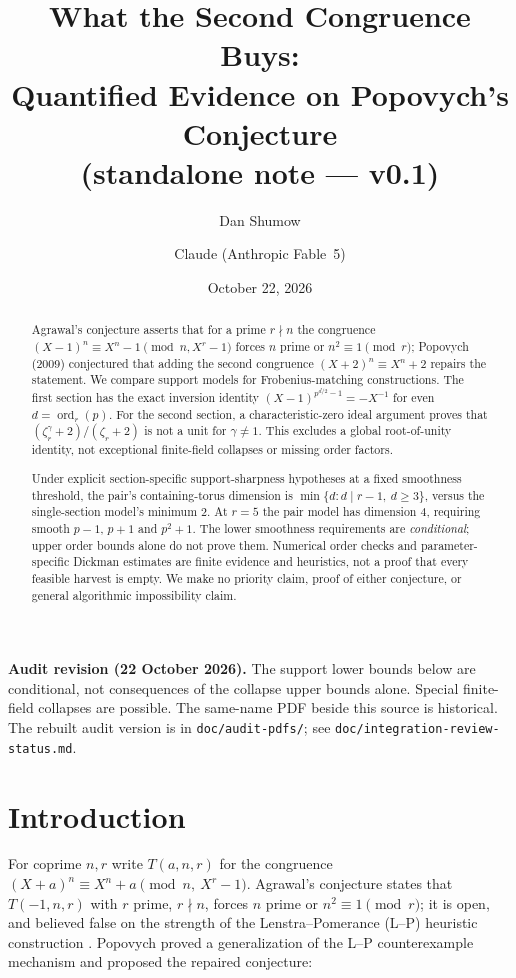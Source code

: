 \documentclass[11pt]{article}
\title{What the Second Congruence Buys:\\ Quantified Evidence on
Popovych's Conjecture\\ \large (standalone note --- v0.1)}
\author{Dan Shumow \and Claude (Anthropic Fable~5)}
\date{October 22, 2026}
\theoremstyle{remark}
\DeclareMathOperator{\ord}{ord}
\begin{document}
\maketitle

\noindent\textbf{Audit revision (22 October 2026).}
The support lower bounds below are conditional, not consequences of the
collapse upper bounds alone. Special finite-field collapses are possible.
The same-name PDF beside this source is historical. The rebuilt audit version
is in \texttt{doc/audit-pdfs/}; see \texttt{doc/integration-review-status.md}.

\begin{abstract}
Agrawal's conjecture asserts that for a prime $r \nmid n$ the congruence
$(X-1)^n \equiv X^n - 1 \pmod{n, X^r - 1}$ forces $n$ prime or
$n^2 \equiv 1 \pmod r$; Popovych (2009) conjectured that adding the second
congruence $(X+2)^n\equiv X^n+2$ repairs the statement.
We compare support models for Frobenius-matching constructions. The first
section has the exact inversion identity
$(X-1)^{p^{d/2}-1}=-X^{-1}$ for even $d=\ord_r(p)$.
For the second section, a characteristic-zero ideal argument proves that
$(\zeta_r^\gamma+2)/(\zeta_r+2)$ is not a unit for $\gamma\ne1$.
This excludes a global root-of-unity identity, not exceptional finite-field
collapses or missing order factors.

Under explicit section-specific support-sharpness hypotheses at a fixed
smoothness threshold, the pair's containing-torus dimension is
$\min\{d:d\mid r-1,\ d\ge3\}$, versus the single-section model's minimum
$2$. At $r=5$ the pair model has dimension $4$, requiring smooth
$p-1$, $p+1$ and $p^2+1$. The lower smoothness requirements are
\emph{conditional}; upper order bounds alone do not prove them.
Numerical order checks and parameter-specific Dickman estimates are finite
evidence and heuristics, not a proof that every feasible harvest is empty.
We make no priority claim, proof of either conjecture, or general
algorithmic impossibility claim.
\end{abstract}

\section{Introduction}

For coprime $n, r$ write $T(a, n, r)$ for the congruence
$(X + a)^n \equiv X^n + a \pmod{n,\ X^r - 1}$. Agrawal's conjecture
\cite{AKS,BP01} states that $T(-1, n, r)$ with $r$ prime, $r \nmid n$,
forces $n$ prime or $n^2 \equiv 1 \pmod r$; it is open, and believed
false on the strength of the Lenstra--Pomerance (L--P) heuristic
construction \cite{LPremarks}. Popovych \cite{Popovych09} proved a
generalization of the L--P counterexample mechanism and proposed the
repaired conjecture:
\end{document}
